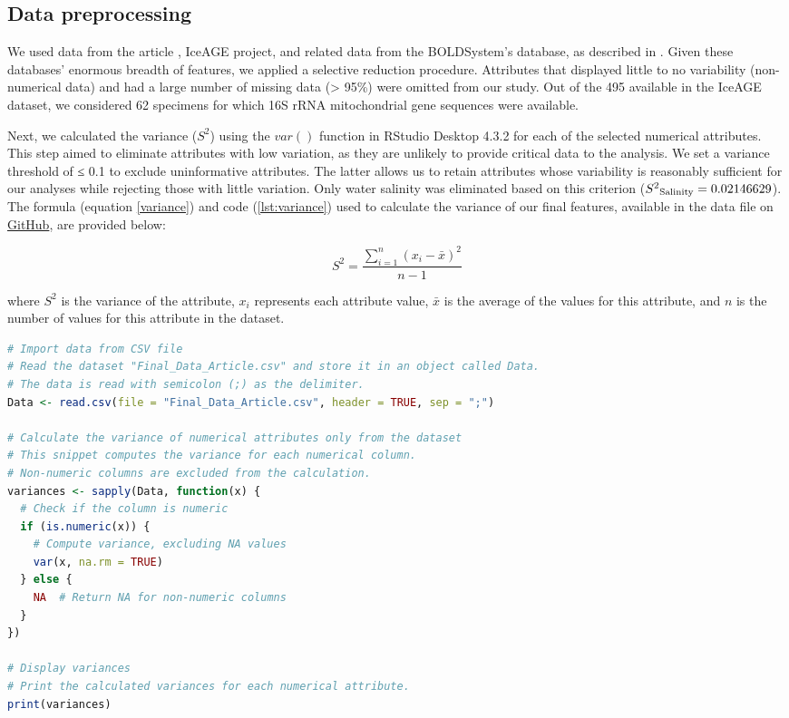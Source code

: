 \subsection{Data preprocessing}
We used data from the article \citep{uhlir_adding_2021}, IceAGE project, and related data from the BOLDSystem's database, as described in \citep{uhlir_adding_2021}. Given these databases' enormous breadth of features, we applied a selective reduction procedure. Attributes that displayed little to no variability (non-numerical data) and had a large number of missing data (> 95\%) were omitted from our study. Out of the 495 available in the IceAGE dataset, we considered 62 specimens for which 16S rRNA mitochondrial gene sequences were available. 

Next, we calculated the variance ($S^2$) using the $var()$ function in RStudio Desktop 4.3.2 for each of the selected numerical attributes. This step aimed to eliminate attributes with low variation, as they are unlikely to provide critical data to the analysis. We set a variance threshold of ≤ 0.1 to exclude uninformative attributes. The latter allows us to retain attributes whose variability is reasonably sufficient for our analyses while rejecting those with little variation. Only water salinity was eliminated based on this criterion ($S^2\textsubscript{Salinity} = 0.02146629$). The formula (equation \ref{variance}) and code (\autoref{lst:variance}) used to calculate the variance of our final features, available in the data file on \href{https://github.com/tahiri-lab/Cumacea_aPhyloGeo}{GitHub}, are provided below:

\begin{equation}\label{variance}
    S^2 = \frac{\sum_{i=1}^{n} (x_i - \bar{x})^2}{n-1}
\end{equation}

where $S^2$ is the variance of the attribute, $x_i$ represents each attribute value, $\bar{x}$ is the average of the values for this attribute, and $n$ is the number of values for this attribute in the dataset.

\begin{lstlisting}[label=lst:variance,language=R,caption=RStudio script to calculate the variance of each numerical attributes in our final dataset]
# Import data from CSV file
# Read the dataset "Final_Data_Article.csv" and store it in an object called Data.
# The data is read with semicolon (;) as the delimiter.
Data <- read.csv(file = "Final_Data_Article.csv", header = TRUE, sep = ";")

# Calculate the variance of numerical attributes only from the dataset
# This snippet computes the variance for each numerical column.
# Non-numeric columns are excluded from the calculation.
variances <- sapply(Data, function(x) {
  # Check if the column is numeric
  if (is.numeric(x)) {
    # Compute variance, excluding NA values
    var(x, na.rm = TRUE)
  } else {
    NA  # Return NA for non-numeric columns
  }
})

# Display variances
# Print the calculated variances for each numerical attribute.
print(variances)
\end{lstlisting}

